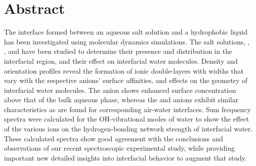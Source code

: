 \section{Abstract}


The interface formed between an aqueous salt solution and a hydrophobic liquid has been investigated using molecular dynamics simulations. The salt solutions, \nacl, \sodnit, and \sodsul have been studied to determine their presence and distribution in the interfacial region, and their effect on interfacial water molecules. Density and orientation profiles reveal the formation of ionic double-layers with widths that vary with the respective anions' surface affinities, and effects on the geometry of interfacial water molecules. The \nit anion shows enhanced surface concentration above that of the bulk aqueous phase, whereas the \cl and \sul anions exhibit similar characteristics as are found for corresponding air-water interfaces. Sum frequency spectra were calculated for the OH-vibrational modes of water to show the effect of the various ions on the hydrogen-bonding network strength of interfacial water. These calculated spectra show good agreement with the conclusions and observations of our recent spectroscopic experimental study, while providing important new detailed insights into interfacial behavior to augment that study.
